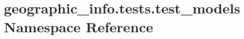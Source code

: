 \hypertarget{namespacegeographic__info_1_1tests_1_1test__models}{\section{geographic\-\_\-info.\-tests.\-test\-\_\-models Namespace Reference}
\label{namespacegeographic__info_1_1tests_1_1test__models}
}
